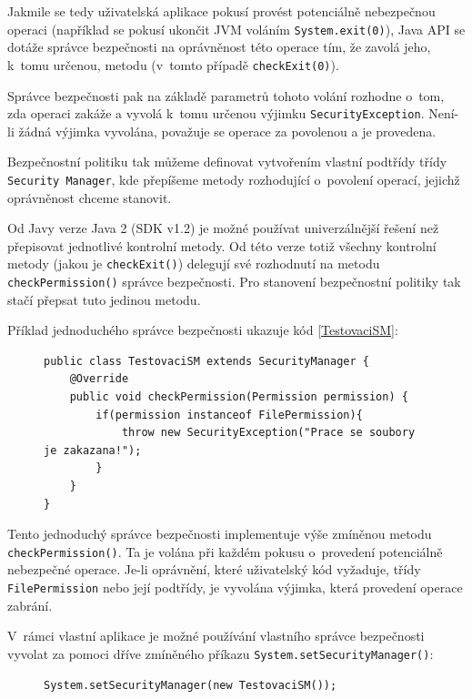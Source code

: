 Jakmile se tedy uživatelská aplikace pokusí provést potenciálně nebezpečnou operaci (například se pokusí ukončit JVM voláním {\tt System.exit(0)}),
Java API se dotáže správce bezpečnosti na oprávněnost této operace tím, že zavolá jeho, k~tomu určenou, metodu (v~tomto případě {\tt checkExit(0)}). \cite{oaks}

Správce bezpečnosti pak na základě parametrů tohoto volání rozhodne o~tom, zda operaci zakáže a vyvolá k~tomu určenou výjimku {\tt SecurityException}.
Není-li žádná výjimka vyvolána, považuje se operace za povolenou a je provedena. \cite{oaks}

Bezpečnostní politiku tak můžeme definovat vytvořením vlastní podtřídy třídy {\tt Security Manager}, kde přepíšeme metody rozhodující o~povolení
operací, jejichž oprávněnost chceme stanovit.

Od Javy verze Java 2 (SDK v1.2) je možné používat univerzálnější řešení než přepisovat jednotlivé kontrolní metody.
Od této verze totiž všechny kontrolní metody (jakou je {\tt checkExit()}) delegují své rozhodnutí na metodu {\tt checkPermission()} správce bezpečnosti.
Pro stanovení bezpečnostní politiky tak stačí přepsat tuto jedinou metodu. \cite{refSecurityManager}

Příklad jednoduchého správce bezpečnosti ukazuje kód \ref{TestovaciSM}:

\begin{figure}[tbh]
\begin{lstlisting}[caption=Jednoduchý správce bezpečnosti, label=TestovaciSM]
public class TestovaciSM extends SecurityManager {
	@Override
	public void checkPermission(Permission permission) {
		if(permission instanceof FilePermission){
			throw new SecurityException("Prace se soubory je zakazana!");
		}
	}
}
\end{lstlisting}
\end{figure}

Tento jednoduchý správce bezpečnosti implementuje výše zmíněnou metodu {\tt checkPermission()}.
Ta je volána při každém pokusu o~provedení potenciálně nebezpečné operace.
Je-li oprávnění, které uživatelský kód vyžaduje, třídy {\tt FilePermission} nebo její podtřídy, je vyvolána výjimka, která provedení operace zabrání.

V~rámci vlastní aplikace je možné používání vlastního správce bezpečnosti vyvolat za pomoci dříve zmíněného příkazu {\tt System.setSecurityManager()}:

\begin{figure}[tbh]
\begin{lstlisting}[caption=Nastavení správce bezpečnosti zevnitř JVM, label=setSM]
System.setSecurityManager(new TestovaciSM());
\end{lstlisting}
\end{figure}


